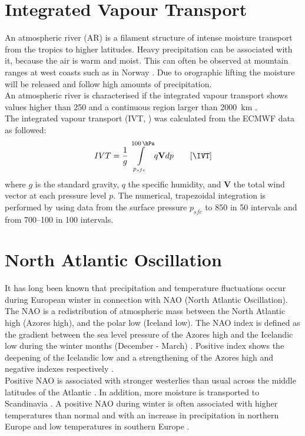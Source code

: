 \section{Integrated Vapour Transport}
\label{sec:dim:atm_riv}
An atmospheric river (AR) is a filament structure of intense moisture transport from the tropics to higher latitudes. Heavy precipitation can be associated with it, because the air is warm and moist. This can often be observed at mountain ranges at west coasts such as in Norway \citep{azad_extreme_2017}. Due to orographic lifting the moisture will be released and follow high amounts of precipitation. 
\\
An atmospheric river is characterised if the integrated vapour transport shows values higher than \SI{250}{\IVT} and a continuous region larger than \SI{2000}{\km} \citep{rutz_climatological_2014}.
\\
The integrated vapour transport (IVT, ) was calculated from the ECMWF data as followed:
\begin{align}
IVT = \frac{1}{g} \int\limits_{p_{sfc}}^{\SI{100}{\hPa}} q \mathbf{V} dp \qquad [\SI{}{\IVT}]
\label{eq:IVT}
\end{align} 
where $g$ is the standard gravity, $q$ the specific humidity, and $\mathbf{V}$ the total wind vector at each pressure level $p$. The numerical, trapezoidal integration is performed by using data from the surface pressure $p_{sfc}$ to \SI{850}{\hPa} in \SI{50}{\hPa} intervals and from \SIrange{700}{100}{\hPa} in \SI{100}{\hPa} intervals.

\section{North Atlantic Oscillation}
It has long been known that precipitation and temperature fluctuations occur during European winter in connection with NAO (North Atlantic Oscillation). The NAO is a redistribution of atmospheric mass between the North Atlantic high (Azores high), and the polar low (Iceland low).
The NAO index is defined as the gradient between the sea level pressure of the Azores high and the Icelandic low during the winter months (December - March) \citep{hurrell_decadal_1995}. Positive index shows the deepening of the Icelandic low and a strengthening of the Azores high and negative indexes respectively \citep{uvo_analysis_2003}. 
\\
Positive NAO is associated with stronger westerlies than usual across the middle latitudes of the Atlantic \citep{uvo_analysis_2003}. In addition, more moisture is transported to Scandinavia \citep{hurrell_decadal_1995}. A positive NAO during winter is often associated with higher temperatures than normal and with an increase in precipitation in northern Europe and low temperatures in southern Europe \citep{uvo_analysis_2003}.
